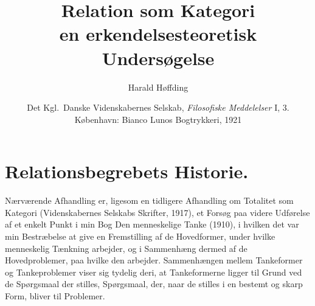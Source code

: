 \documentclass[12pt]{article}
\title{\textbf{Relation som Kategori}\\[0.5em]
  \large en erkendelsesteoretisk Undersøgelse}
\author{Harald Høffding}
\date{Det Kgl.\ Danske Videnskabernes Selskab,
  \textit{Filosofiske Meddelelser} I, 3.\\
  København: Bianco Lunos Bogtrykkeri, 1921}
\newcommand{\opage}[1]{\marginnote{\footnotesize\textit{[#1]}}}
\begin{document}
\maketitle
\tableofcontents
\bigskip


\opage{3} %
\section{Relationsbegrebets Historie.}\label{sec:1}

\noindent Nærværende Afhandling er, ligesom en tidligere Afhandling om
\guillemotright Totalitet som Kategori\guillemotleft{} (Videnskabernes
Selskabs Skrifter, 1917), et Forsøg paa videre Udførelse af et enkelt Punkt i
min Bog \guillemotright Den menneskelige Tanke\guillemotleft{} (1910), i
hvilken det var min Bestræbelse at give en Fremstilling af de Hovedformer,
under hvilke menneskelig Tænkning arbejder, og i Sammenhæng dermed af de
Hovedproblemer, paa hvilke den arbejder. Sammenhængen mellem Tankeformer og
Tankeproblemer viser sig tydelig deri, at Tankeformerne ligger til Grund ved
de Spørgsmaal der stilles, Spørgsmaal, der, naar de stilles i en bestemt og
skarp Form, bliver til Problemer.
\end{document}
